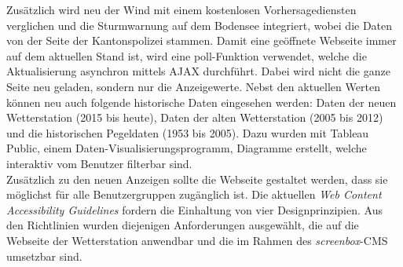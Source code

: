 \documentclass[10pt]{article}
\begin{document}
\begin{multicols}{2}
Zusätzlich wird neu der Wind mit einem kostenlosen Vorhersagediensten verglichen und die Sturmwarnung auf dem Bodensee integriert, wobei die Daten von der Seite der Kantonspolizei stammen. Damit eine geöffnete Webseite immer auf dem aktuellen Stand ist, wird eine poll-Funktion verwendet, welche die Aktualisierung asynchron mittels AJAX durchführt. Dabei wird nicht die ganze Seite neu geladen, sondern nur die Anzeigewerte. Nebst den aktuellen Werten können neu auch folgende historische Daten eingesehen werden: Daten der neuen Wetterstation (2015 bis heute), Daten der alten Wetterstation (2005 bis 2012) und die historischen Pegeldaten (1953 bis 2005). Dazu wurden mit Tableau Public, einem Daten-Visualisierungsprogramm, Diagramme erstellt, welche interaktiv vom Benutzer filterbar sind.\\ 
Zusätzlich zu den neuen Anzeigen sollte die Webseite gestaltet werden, dass sie möglichst für alle Benutzergruppen zugänglich ist. Die aktuellen \emph{Web Content Accessibility Guidelines} fordern die Einhaltung von vier Designprinzipien. Aus den Richtlinien wurden diejenigen Anforderungen ausgewählt, die auf die Webseite der Wetterstation anwendbar und die im Rahmen des \textit{screenbox}-CMS umsetzbar sind.

\end{multicols}
\end{document}
